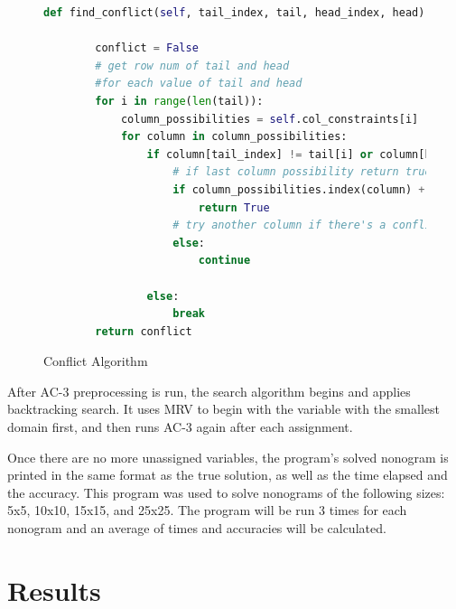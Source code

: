 \documentclass[12pt, letterpaper]
{article}
\begin{document}
\begin{figure}[H]
    \caption{Conflict Algorithm}
    \label{code.1}
    \begin{lstlisting}[language=Python]
    def find_conflict(self, tail_index, tail, head_index, head):
           
        conflict = False
        # get row num of tail and head
        #for each value of tail and head
        for i in range(len(tail)):
            column_possibilities = self.col_constraints[i]
            for column in column_possibilities:
                if column[tail_index] != tail[i] or column[head_index] != head[i]:
                    # if last column possibility return true
                    if column_possibilities.index(column) + 1 == len(column_possibilities):
                        return True
                    # try another column if there's a conflict
                    else:
                        continue
                    
                else:
                    break
        return conflict
    \end{lstlisting}
\end{figure}

After AC-3 preprocessing is run, the search algorithm begins and applies backtracking search. It uses MRV to begin with the variable with the smallest domain first, and then runs AC-3 again after each assignment.

Once there are no more unassigned variables, the program's solved nonogram is printed in the same format as the true solution, as well as the time elapsed and the accuracy. This program was used to solve nonograms of the following sizes: 5x5, 10x10, 15x15, and 25x25. The program will be run 3 times for each nonogram and an average of times and accuracies will be calculated.

\section{Results}
\end{document}
